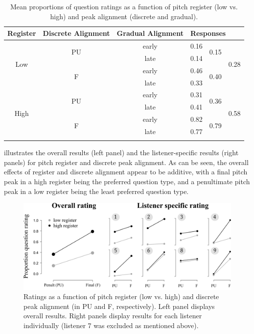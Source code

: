  \begin{table}[htbp]
  \centering
    \begin{tabular}{cccccc}
\lsptoprule
    \textbf{Register} & \textbf{Discrete Alignment} & \textbf{Gradual Alignment} & \multicolumn{3}{l}{\textbf{Responses}} \\
    \midrule
    \multirow{4}[8]{*}{Low} & \multirow{2}[4]{*}{PU} & early & 0.16 & \multirow{2}[4]{*}{0.15} & \multirow{4}[8]{*}{0.28} \\
\cmidrule{3-4}          &       & late  & 0.14  &       &  \\
\cmidrule{2-5}          & \multirow{2}[4]{*}{F} & early & 0.46  & \multirow{2}[4]{*}{0.40} &  \\
\cmidrule{3-4}          &       & late  & 0.33  &       &  \\
    \midrule
    \multirow{4}[8]{*}{High} & \multirow{2}[4]{*}{PU} & early & 0.31  & \multirow{2}[4]{*}{0.36} & \multirow{4}[8]{*}{0.58} \\
\cmidrule{3-4}          &       & late  & 0.41  &       &  \\
\cmidrule{2-5}          & \multirow{2}[4]{*}{F} & early & 0.82  & \multirow{2}[4]{*}{0.79} &  \\
\cmidrule{3-4}          &       & late  & 0.77  &       &  \\
    \lspbottomrule
    \end{tabular}%
\caption{Mean proportions of question ratings as a function of pitch register (low vs. high) and peak alignment (discrete and gradual).}
  \label{tab:5.9}%
\end{table}%

 illustrates the overall results (left panel) and the listener-specific results (right panels) for pitch register and discrete peak alignment. As can be seen, the overall effects of register and discrete alignment appear to be additive, with a final pitch peak in a high register being the preferred question type, and a penultimate pitch peak in a low register being the least preferred question type.

  \begin{figure}
  \centering 
   \includegraphics[width=1\textwidth]{figures/Figure_5_12.png}
  \caption{Ratings as a function of pitch register (low vs. high) and discrete peak alignment (in PU and F, respectively). Left panel displays overall results. Right panels display results for each listener individually (listener 7 was excluded as mentioned above).}
   \label{fig:5.12}
   \end{figure}

